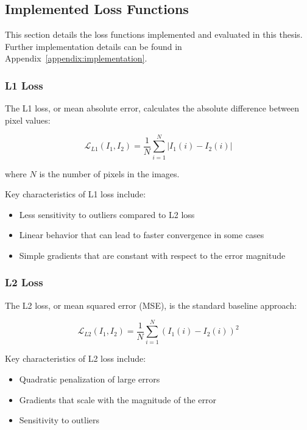 \subsection{Implemented Loss Functions}

This section details the loss functions implemented and evaluated in this thesis. Further implementation details can be found in Appendix~\ref{appendix:implementation}. 

\subsubsection{L1 Loss}

The L1 loss, or mean absolute error, calculates the absolute difference between pixel values:

\begin{equation}
\mathcal{L}_{L1}(I_1, I_2) = \frac{1}{N} \sum_{i=1}^{N} |I_1(i) - I_2(i)|
\end{equation}

where $N$ is the number of pixels in the images.

Key characteristics of L1 loss include:
\begin{itemize}
    \item Less sensitivity to outliers compared to L2 loss
    \item Linear behavior that can lead to faster convergence in some cases
    \item Simple gradients that are constant with respect to the error magnitude
\end{itemize}

\subsubsection{L2 Loss}

The L2 loss, or mean squared error (MSE), is the standard baseline approach:

\begin{equation}
\mathcal{L}_{L2}(I_1, I_2) = \frac{1}{N} \sum_{i=1}^{N} (I_1(i) - I_2(i))^2
\end{equation}

Key characteristics of L2 loss include:
\begin{itemize}
    \item Quadratic penalization of large errors
    \item Gradients that scale with the magnitude of the error
    \item Sensitivity to outliers
\end{itemize}

